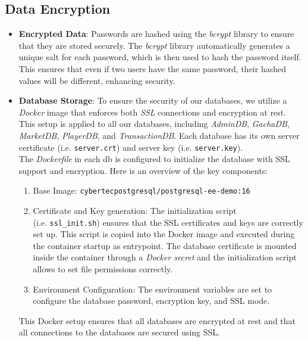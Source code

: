 \documentclass{article}
\begin{document}
\subsection{Data Encryption}
\begin{itemize}
    \item \textbf{Encrypted Data}: Passwords are hashed using the \emph{bcrypt} library to ensure that they are stored securely. The \emph{bcrypt} library automatically generates a unique salt for each password, which is then used to hash the password itself. This ensures that even if two users have the same password, their hashed values will be different, enhancing security.
    \item \textbf{Database Storage}: To ensure the security of our databases, we utilize a \emph{Docker} image that enforces both \emph{SSL} connections and encryption at rest. This setup is applied to all our databases, including \emph{AdminDB}, \emph{GachaDB}, \emph{MarketDB}, \emph{PlayerDB}, and \emph{TransactionDB}. Each database has its own server certificate (i.e. \texttt{server.crt}) and server key (i.e. \texttt{server.key}). \\
          The \emph{Dockerfile} in each db is configured to initialize the database with SSL support and encryption. Here is an overview of the key components:
          \begin{enumerate}
              \item Base Image: \texttt{cybertecpostgresql/postgresql-ee-demo:16}
              \item Certificate and Key generation: The initialization script \\ (i.e. \texttt{ssl\_init.sh}) ensures that the SSL certificates and keys are correctly set up. This script is copied into the Docker image and executed during the container startup as entrypoint. The database certificate is mounted inside the container through a \emph{Docker secret} and the initialization script allows to set file permissions correctly.
              \item Environment Configuration: The environment variables are set to configure the database password, encryption key, and SSL mode.
          \end{enumerate}
          This Docker setup ensures that all databases are encrypted at rest and that all connections to the databases are secured using SSL.
\end{itemize}

\newpage
\end{document}
